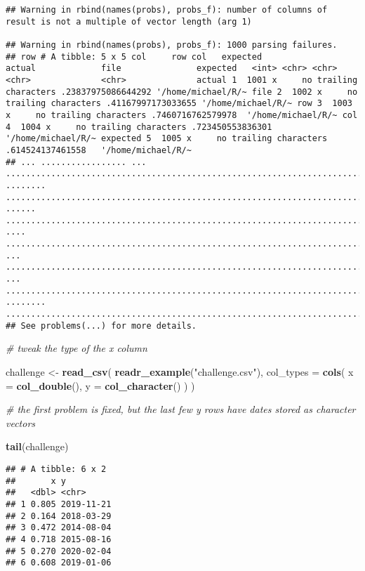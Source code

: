 \documentclass[]{article}
\newenvironment{Shaded}{\begin{snugshade}}{\end{snugshade}}
\newcommand{\KeywordTok}[1]{\textcolor[rgb]{0.13,0.29,0.53}{\textbf{#1}}}
\newcommand{\DataTypeTok}[1]{\textcolor[rgb]{0.13,0.29,0.53}{#1}}
\newcommand{\StringTok}[1]{\textcolor[rgb]{0.31,0.60,0.02}{#1}}
\newcommand{\CommentTok}[1]{\textcolor[rgb]{0.56,0.35,0.01}{\textit{#1}}}
\newcommand{\NormalTok}[1]{#1}
\begin{document}
\begin{verbatim}
## Warning in rbind(names(probs), probs_f): number of columns of result is not a multiple of vector length (arg 1)

## Warning in rbind(names(probs), probs_f): 1000 parsing failures.
## row # A tibble: 5 x 5 col     row col   expected               actual             file               expected   <int> <chr> <chr>                  <chr>              <chr>              actual 1  1001 x     no trailing characters .23837975086644292 '/home/michael/R/~ file 2  1002 x     no trailing characters .41167997173033655 '/home/michael/R/~ row 3  1003 x     no trailing characters .7460716762579978  '/home/michael/R/~ col 4  1004 x     no trailing characters .723450553836301   '/home/michael/R/~ expected 5  1005 x     no trailing characters .614524137461558   '/home/michael/R/~
## ... ................. ... .......................................................................... ........ .......................................................................... ...... .......................................................................... .... .......................................................................... ... .......................................................................... ... .......................................................................... ........ ..........................................................................
## See problems(...) for more details.
\end{verbatim}

\begin{Shaded}
\begin{Highlighting}[]
\CommentTok{# tweak the type of the x column}

\NormalTok{challenge <-}\StringTok{ }\KeywordTok{read_csv}\NormalTok{(}
  \KeywordTok{readr_example}\NormalTok{(}\StringTok{"challenge.csv"}\NormalTok{),}
  \DataTypeTok{col_types =} \KeywordTok{cols}\NormalTok{(}
    \DataTypeTok{x =} \KeywordTok{col_double}\NormalTok{(),}
    \DataTypeTok{y =} \KeywordTok{col_character}\NormalTok{()}
\NormalTok{  )}
\NormalTok{)}

\CommentTok{# the first problem is fixed, but the last few y rows have dates stored as character vectors}

\KeywordTok{tail}\NormalTok{(challenge)}
\end{Highlighting}
\end{Shaded}

\begin{verbatim}
## # A tibble: 6 x 2
##       x y         
##   <dbl> <chr>     
## 1 0.805 2019-11-21
## 2 0.164 2018-03-29
## 3 0.472 2014-08-04
## 4 0.718 2015-08-16
## 5 0.270 2020-02-04
## 6 0.608 2019-01-06
\end{verbatim}
\end{document}
